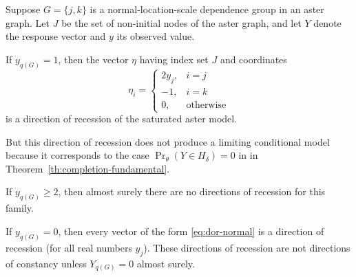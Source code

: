 \begin{theorem} \label{th:dor-normal}
Suppose $G = \{j, k\}$ is a normal-location-scale dependence group
in an aster graph.
Let $J$ be the set of non-initial nodes of the aster graph,
and let $Y$ denote the response vector and $y$ its observed value.

If $y_{q(G)} = 1$, then the vector $\eta$ having index set $J$
and coordinates
\begin{equation} \label{eq:dor-normal}
   \eta_i = \begin{cases} 2 y_j, & i = j \\
   -1, & i = k \\
   0, & \text{otherwise} \end{cases}
\end{equation}
is a direction of recession of the saturated aster model.

But this direction of recession does not produce a limiting conditional model
because it corresponds to the case $\Pr_\theta(Y \in H_\delta) = 0$ in
in Theorem~\ref{th:completion-fundamental}.

If $y_{q(G)} \ge 2$, then almost surely there are no directions of recession
for this family.

If $y_{q(G)} = 0$, then every vector of the form \eqref{eq:dor-normal}
is a direction of recession (for all real numbers $y_j$).
These directions of recession are not directions of constancy unless
$Y_{q(G)} = 0$ almost surely.
\end{theorem}

